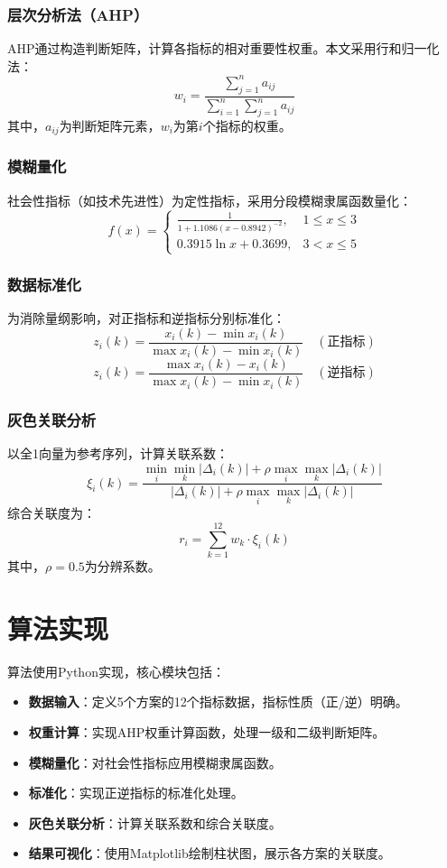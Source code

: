 \documentclass[12pt]{article}
\begin{document}
\subsubsection{层次分析法（AHP）}
AHP通过构造判断矩阵，计算各指标的相对重要性权重。本文采用行和归一化法：
\[
w_i = \frac{\sum_{j=1}^n a_{ij}}{\sum_{i=1}^n \sum_{j=1}^n a_{ij}}
\]
其中，$a_{ij}$为判断矩阵元素，$w_i$为第$i$个指标的权重。

\subsubsection{模糊量化}
社会性指标（如技术先进性）为定性指标，采用分段模糊隶属函数量化：
\[
f(x) = \begin{cases} 
\frac{1}{1 + 1.1086 (x - 0.8942)^{-2}}, & 1 \leq x \leq 3 \\
0.3915 \ln x + 0.3699, & 3 < x \leq 5 
\end{cases}
\]

\subsubsection{数据标准化}
为消除量纲影响，对正指标和逆指标分别标准化：
\[
z_i(k) = \frac{x_i(k) - \min x_i(k)}{\max x_i(k) - \min x_i(k)} \quad (\text{正指标})
\]
\[
z_i(k) = \frac{\max x_i(k) - x_i(k)}{\max x_i(k) - \min x_i(k)} \quad (\text{逆指标})
\]

\subsubsection{灰色关联分析}
以全1向量为参考序列，计算关联系数：
\[
\xi_i(k) = \frac{\min_i \min_k |\Delta_i(k)| + \rho \max_i \max_k |\Delta_i(k)|}{|\Delta_i(k)| + \rho \max_i \max_k |\Delta_i(k)|}
\]
综合关联度为：
\[
r_i = \sum_{k=1}^{12} w_k \cdot \xi_i(k)
\]
其中，$\rho=0.5$为分辨系数。

\section{算法实现}
算法使用Python实现，核心模块包括：
\begin{itemize}
    \item \textbf{数据输入}：定义5个方案的12个指标数据，指标性质（正/逆）明确。
    \item \textbf{权重计算}：实现AHP权重计算函数，处理一级和二级判断矩阵。
    \item \textbf{模糊量化}：对社会性指标应用模糊隶属函数。
    \item \textbf{标准化}：实现正逆指标的标准化处理。
    \item \textbf{灰色关联分析}：计算关联系数和综合关联度。
    \item \textbf{结果可视化}：使用Matplotlib绘制柱状图，展示各方案的关联度。
\end{itemize}
\end{document}
